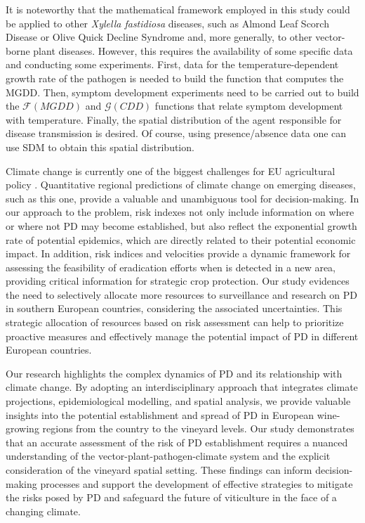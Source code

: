 It is noteworthy that the mathematical framework employed in this study
could be applied to other \textit{Xylella fastidiosa} diseases, such as Almond
Leaf Scorch Disease or Olive Quick Decline Syndrome and, more generally, to
other vector-borne plant diseases. However, this requires the availability of
some specific data and conducting some experiments. First, data for the
temperature-dependent growth rate of the pathogen is needed to build the
function that computes the MGDD. Then, symptom development experiments need to
be carried out to build the $\mathcal{F}(MGDD)$ and $\mathcal{G}(CDD)$
functions that relate symptom development with temperature. Finally, the
spatial distribution of the agent responsible for disease transmission is
desired. Of course, using presence/absence data one can use SDM to obtain this
spatial distribution.

Climate change is currently one of the biggest challenges for EU
agricultural policy \cite{fellmann2018major}. Quantitative regional predictions
of climate change on emerging diseases, such as this one, provide a valuable
and unambiguous tool for decision-making. In our approach to the problem, risk
indexes not only include information on where or where not PD may become
established, but also reflect the exponential growth rate of potential
epidemics, which are directly related to their potential economic impact. In
addition, risk indices and velocities provide a dynamic framework for assessing
the feasibility of eradication efforts when \xf{} is detected in a new area,
providing critical information for strategic crop protection. Our study
evidences the need to selectively allocate more resources to surveillance and
research on PD in southern European countries, considering the associated
uncertainties. This strategic allocation of resources based on risk assessment
can help to prioritize proactive measures and effectively manage the potential
impact of PD in different European countries.

Our research highlights the complex dynamics of PD and its relationship
with climate change. By adopting an interdisciplinary approach that integrates
climate projections, epidemiological modelling, and spatial analysis, we
provide valuable insights into the potential establishment and spread of PD in
European wine-growing regions from the country to the vineyard levels. Our
study demonstrates that an accurate assessment of the risk of PD establishment
requires a nuanced understanding of the vector-plant-pathogen-climate system
and the explicit consideration of the vineyard spatial setting. These findings
can inform decision-making processes and support the development of effective
strategies to mitigate the risks posed by PD and safeguard the future of
viticulture in the face of a changing climate.